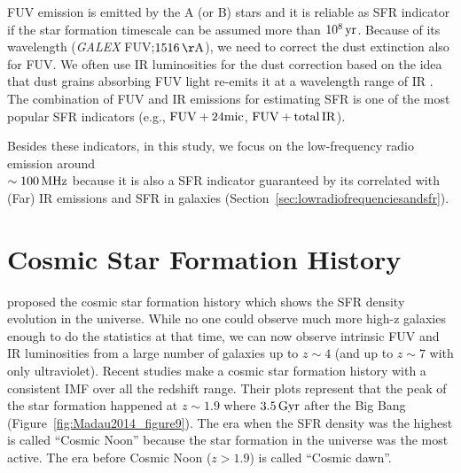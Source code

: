 FUV emission is emitted by the A (or B) stars and it is reliable as SFR indicator if the star formation timescale can be assumed more than $10^8\,\mathrm{yr}$.
Because of its wavelength ({\it GALEX\/} FUV;\@$1516\,\mr{\AA}$), we need to correct the dust extinction also for FUV\@.
We often use IR luminosities for the dust correction based on the idea that dust grains absorbing FUV light re-emits it at a wavelength range of IR \citep{Kennicutt1998, Murphy2011}.
The combination of FUV and IR emissions for estimating SFR is one of the most popular SFR indicators (e.g., $\mathrm{FUV + 24mic}$, $\mathrm{FUV + total\,IR}$).

Besides these indicators, in this study, we focus on the low-frequency radio emission around\\ $\sim100\,\mathrm{MHz}$ because it is also a SFR indicator guaranteed by its correlated with (Far) IR emissions and SFR in galaxies (Section~\ref{sec:lowradiofrequenciesandsfr}).





\section{Cosmic Star Formation History}\label{sec:cosmicstarformationhistory}

\citet{Tinsley1980} proposed the cosmic star formation history which shows the SFR density evolution in the universe.
While no one could observe much more high-z galaxies enough to do the statistics at that time, we can now observe intrinsic FUV and IR luminosities from a large number of galaxies up to $z \sim 4$ (and up to $z \sim 7$ with only ultraviolet).
    Recent studies \citep{Hopkins2006, Madau2014} make a cosmic star formation history with a consistent IMF over all the redshift range.
Their plots represent that the peak of the star formation happened at $z\sim1.9$ where $3.5\,\mathrm{Gyr}$ after the Big Bang (Figure~\ref{fig:Madau2014_figure9}).
The era when the SFR density was the highest is called ``Cosmic Noon'' because the star formation in the universe was the most active.
The era before Cosmic Noon ($z > 1.9$) is called  ``Cosmic dawn''.

